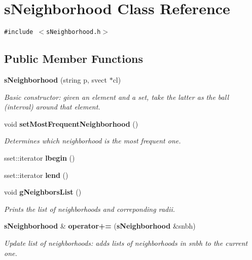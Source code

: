 \section{s\-Neighborhood Class Reference}
\label{classsNeighborhood}
{\tt \#include $<$s\-Neighborhood.h$>$}

\subsection*{Public Member Functions}
\begin{CompactItemize}
\item 
{\bf s\-Neighborhood} (string p, svect $\ast$cl)
\begin{CompactList}\small\item\em Basic constructor: given an element and a set, take the latter as the ball (interval) around that element. \item\end{CompactList}\item 
void {\bf set\-Most\-Frequent\-Neighborhood} ()
\begin{CompactList}\small\item\em Determines which neighborhood is the most frequent one. \item\end{CompactList}\item 
sset::iterator {\bf lbegin} ()\label{classsNeighborhood_a3}

\item 
sset::iterator {\bf lend} ()\label{classsNeighborhood_a4}

\item 
void {\bf g\-Neighbors\-List} ()\label{classsNeighborhood_a5}

\begin{CompactList}\small\item\em Prints the list of neighborhoods and correponding radii. \item\end{CompactList}\item 
{\bf s\-Neighborhood} \& {\bf operator+=} ({\bf s\-Neighborhood} \&snbh)
\begin{CompactList}\small\item\em Update list of neighborhoods: adds lists of neighborhoods in snbh to the current one. \item\end{CompactList}\end{CompactItemize}
